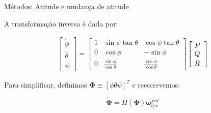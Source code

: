 \documentclass{beamer}
\begin{document}
\begin{frame}{Métodos: Atitude e mudança de atitude}

 A transformação inversa é dada por:

\begin{align*}\label{eq:1.4-4}%
    \begin{bmatrix}
        \dot\phi \\
        \dot\theta \\
        \dot\psi
    \end{bmatrix}
    =
    \begin{bmatrix}
        1 & \sin{\phi}\tan{\theta} & \cos{\phi}\tan{\theta} \\
        0 & \cos{\phi} & -\sin{\phi} \\
        0 & \frac{\sin{\phi}}{\cos{\theta}} & \frac{\cos{\phi}}{\cos{\theta}}
    \end{bmatrix}
    \begin{bmatrix}
        P \\ Q \\ R
    \end{bmatrix}
\end{align*}

Para simplificar, definimos \(\mathbf{\Phi} \equiv \left[\phi \theta \psi \right]^T \) e reescrevemos:

\begin{equation}\label{eq:1.4-5}%
    \dot{\mathbf{\Phi}} = H \left( \mathbf{\Phi} \right) \mathbf{\omega}^{frd}_{b/r}
\end{equation}

\end{frame}
\end{document}

